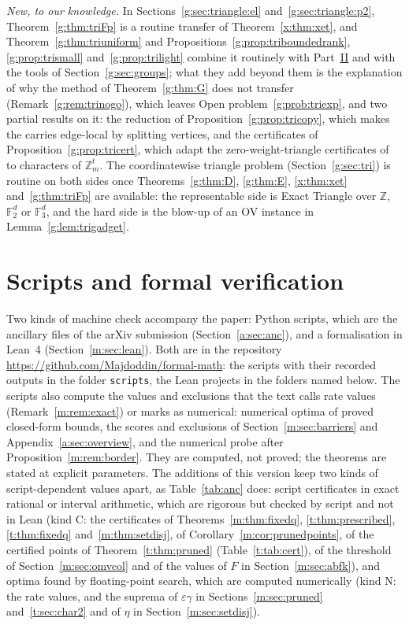 \documentclass[11pt]{article}
\theoremstyle{definition}
\theoremstyle{remark}
\newcommand{\Z}{\mathbb{Z}}
\newcommand{\F}{\mathbb{F}_2}
\begin{document}
\emph{New, to our knowledge.} In Sections~\ref{g:sec:triangle:el} and~\ref{g:sec:triangle:p2}, Theorem~\ref{g:thm:triFp} is a routine transfer of Theorem~\ref{x:thm:xet}, and Theorem~\ref{g:thm:triuniform} and Propositions~\ref{g:prop:triboundedrank}, \ref{g:prop:trismall} and~\ref{g:prop:trilight} combine it routinely with Part~\hyperref[m:partII]{II} and with the tools of Section~\ref{g:sec:groups}; what they add beyond them is the explanation of why the method of Theorem~\ref{g:thm:G} does not transfer (Remark~\ref{g:rem:trinogo}), which leaves Open problem~\ref{g:prob:triexp}, and two partial results on it: the reduction of Proposition~\ref{g:prop:tricopy}, which makes the carries edge-local by splitting vertices, and the certificates of Proposition~\ref{g:prop:tricert}, which adapt the zero-weight-triangle certificates of~\cite[Lemma~11]{CGIMPS16} to characters of $\Z_m^t$. The coordinatewise triangle problem (Section~\ref{g:sec:tri}) is routine on both sides once Theorems~\ref{g:thm:D}, \ref{g:thm:E}, \ref{x:thm:xet} and~\ref{g:thm:triFp} are available: the representable side is Exact Triangle over $\Z$, $\F^d$ or $\mathbb F_3^d$, and the hard side is the blow-up of an OV instance in Lemma~\ref{g:lem:trigadget}.

\section{Scripts and formal verification}\label{m:sec:status}

Two kinds of machine check accompany the paper: Python scripts, which are the ancillary files of the arXiv submission (Section~\ref{a:sec:anc}), and a formalisation in Lean~4 (Section~\ref{m:sec:lean}). Both are in the repository \url{https://github.com/Majdoddin/formal-math}: the scripts with their recorded outputs in the folder \texttt{scripts}, the Lean projects in the folders named below. The scripts also compute the values and exclusions that the text calls rate values (Remark~\ref{m:rem:exact}) or marks as numerical: numerical optima of proved closed-form bounds, the scores and exclusions of Section~\ref{m:sec:barriers} and Appendix~\ref{a:sec:overview}, and the numerical probe after Proposition~\ref{m:rem:border}. They are computed, not proved; the theorems are stated at explicit parameters.
The additions of this version keep two kinds of script-dependent values apart, as Table~\ref{tab:anc} does: script certificates in exact rational or interval arithmetic, which are rigorous but checked by script and not in Lean (kind C: the certificates of Theorems~\ref{m:thm:fixedq}, \ref{t:thm:prescribed}, \ref{t:thm:fixedq} and~\ref{m:thm:setdisj}, of Corollary~\ref{m:cor:prunedpoints}, of the certified points of Theorem~\ref{t:thm:pruned} (Table~\ref{t:tab:cert}), of the threshold of Section~\ref{m:sec:omvcol} and of the values of $F$ in Section~\ref{m:sec:abfk}), and optima found by floating-point search, which are computed numerically (kind N: the rate values, and the suprema of $\varepsilon\gamma$ in Sections~\ref{m:sec:pruned} and~\ref{t:sec:char2} and of $\eta$ in Section~\ref{m:sec:setdisj}).
\end{document}
